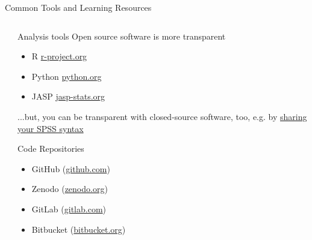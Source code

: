 \begin{block}{Common Tools and Learning Resources}
\begin{columns}[t]
\begin{column}{.45\linewidth}


  \end{column}\hfill
   
  \begin{column}{.45\linewidth}

    \begin{subblock}{ \hfill Analysis tools\hfill {}}
      Open source software is more transparent \\ 
      \vspace{0.5em}
      \begin{itemize}
        \item {} R \href{https://www.r-project.org/}{r-project.org}
        \item {} Python \href{https://www.python.org/}{python.org}
        \item JASP \href{https://jasp-stats.org/}{jasp-stats.org}
      \end{itemize}

      ...but, you can be transparent with closed-source software, too, e.g. by \href{https://www.spss-tutorials.com/spss-syntax/}{sharing your SPSS syntax}
    \end{subblock}
    
    \begin{subblock}{\hfill Code Repositories\hfill {}}
      \begin{itemize}
        \item {} GitHub (\href{https://www.github.com}{github.com})
        \item Zenodo (\href{https://www.zenodo.org}{zenodo.org})
        \item {} GitLab (\href{https://www.gitlab.com}{gitlab.com})
        \item {} Bitbucket (\href{https://www.bitbucket.org}{bitbucket.org})
      \end{itemize}
    \end{subblock}
   

\end{column}
\end{columns}
\end{block}
